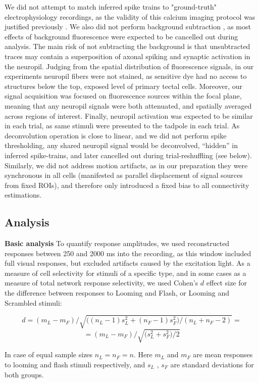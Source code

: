 \documentclass{article}
\begin{document}
We did not attempt to match inferred spike trains to "ground-truth" electrophysiology recordings, as the validity of this calcium imaging protocol was justified previously \citep{xu2011,truszkowski2017}. We also did not perform background subtraction \citep{truszkowski2017}, as most effects of background fluorescence were expected to be cancelled out during analysis. The main risk of not subtracting the background is that unsubtracted traces may contain a superposition of axonal spiking and synaptic activation in the neuropil. Judging from the spatial distribution of fluorescence signals, in our experiments neuropil fibers were not stained, as sensitive dye had no access to structures below the top, exposed level of primary tectal cells. Moreover, our signal acquisition was focused on fluorescence sources within the focal plane, meaning that any  neuropil signals were both attenuated, and spatially averaged across regions of interest. Finally, neuropil activation was expected to be similar in each trial, as same stimuli were presented to the tadpole in each trial. As deconvolution operation is close to linear, and we did not perform spike thresholding, any shared neuropil signal would be deconvolved, “hidden” in inferred spike-trains, and later cancelled out during trial-reshuffling (see below). Similarly, we did not address motion artifacts, as in our preparation they were synchronous in all cells (manifested as parallel displacement of signal sources from fixed ROIs), and therefore only introduced a fixed bias to all connectivity estimations.

\subsection*{Analysis}

\textbf{Basic analysis} To quantify response amplitudes, we used reconstructed responses between 250 and 2000 ms into the recording, as this window included full visual responses, but excluded artifacts caused by the excitation light. As a measure of cell selectivity for stimuli of a specific type, and in some cases as a measure of total network response selectivity, we used Cohen’s $d$ effect size for the difference between responses to Looming and Flash, or Looming and Scrambled stimuli:

\[ d = (m_L-m_F)/ \sqrt{ \big((n_L-1) s^2_L + (n_F-1) s^2_F)/(n_L + n_F - 2)} = \]
\[ =(m_L-m_F)/\sqrt{\big(s^2_L+s^2_F\big)/2} \]

In case of equal sample sizes $n_L=n_F=n$. Here $m_L$ and $m_F$ are mean responses to looming and flash stimuli respectively, and $s_L$ , $s_F$ are standard deviations for both groups.
\end{document}
